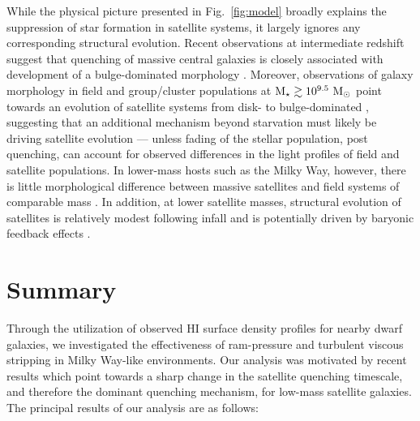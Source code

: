 While the physical picture presented in Fig.~\ref{fig:model} broadly
explains the suppression of star formation in satellite systems, it
largely ignores any corresponding structural evolution. 
%
Recent observations at intermediate redshift suggest that quenching of
massive central galaxies is closely associated with development of a
bulge-dominated morphology \citep{bell12, cheung12}.
%
Moreover, observations of galaxy morphology in field and group/cluster
populations at ${\rm M}_{\star} \gtrsim 10^{9.5}~{\rm M}_{\odot}$ point towards an
evolution of satellite systems from disk- to bulge-dominated
\citep{vdb08, weinmann09}, suggesting that an additional mechanism
beyond starvation must likely be driving satellite evolution ---
unless fading of the stellar population, post quenching, can account
for observed differences in the light profiles of field and satellite
populations. 
%
In lower-mass hosts such as the Milky Way, however, there is little
morphological difference between massive satellites and field systems
of comparable mass \citep{phillips14}.
%
In addition, at lower satellite masses, structural evolution of
satellites is relatively modest following infall and is potentially
driven by baryonic feedback effects \citep{sj16, wheeler16}.






\section{Summary}
\label{sec:endgame}

Through the utilization of observed H{\scriptsize I} surface density
profiles for nearby dwarf galaxies, we investigated the effectiveness
of ram-pressure and turbulent viscous stripping in Milky Way-like
environments. 
%
Our analysis was motivated by recent results which point towards a
sharp change in the satellite quenching timescale, and therefore the
dominant quenching mechanism, for low-mass satellite galaxies. The
principal results of our analysis are as follows:



